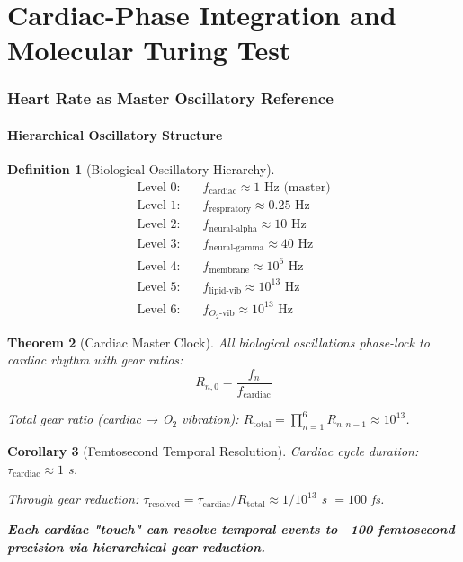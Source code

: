 \documentclass[11pt,a4paper]{article}
\newtheorem{theorem}{Theorem}[section]
\newtheorem{corollary}[theorem]{Corollary}
\theoremstyle{definition}
\newtheorem{definition}[theorem]{Definition}
\theoremstyle{remark}
\begin{document}
\part{Cardiac-Phase Integration and Molecular Turing Test}

\section{Heart Rate as Master Oscillatory Reference}

\subsection{Hierarchical Oscillatory Structure}

\begin{definition}[Biological Oscillatory Hierarchy]
\begin{align}
\text{Level 0}: \quad & f_{\text{cardiac}} \approx 1 \text{ Hz (master)} \\
\text{Level 1}: \quad & f_{\text{respiratory}} \approx 0.25 \text{ Hz} \\
\text{Level 2}: \quad & f_{\text{neural-alpha}} \approx 10 \text{ Hz} \\
\text{Level 3}: \quad & f_{\text{neural-gamma}} \approx 40 \text{ Hz} \\
\text{Level 4}: \quad & f_{\text{membrane}} \approx 10^6 \text{ Hz} \\
\text{Level 5}: \quad & f_{\text{lipid-vib}} \approx 10^{13} \text{ Hz} \\
\text{Level 6}: \quad & f_{O_2\text{-vib}} \approx 10^{13} \text{ Hz}
\end{align}
\end{definition}

\begin{theorem}[Cardiac Master Clock]
All biological oscillations phase-lock to cardiac rhythm with gear ratios:
\begin{equation}
R_{n,0} = \frac{f_n}{f_{\text{cardiac}}}
\end{equation}

Total gear ratio (cardiac → O$_2$ vibration): $R_{\text{total}} = \prod_{n=1}^6 R_{n,n-1} \approx 10^{13}$.
\end{theorem}

\begin{corollary}[Femtosecond Temporal Resolution]
Cardiac cycle duration: $\tau_{\text{cardiac}} \approx 1$ s.

Through gear reduction: $\tau_{\text{resolved}} = \tau_{\text{cardiac}}/R_{\text{total}} \approx 1/10^{13}$ s $= 100$ fs.

\textbf{Each cardiac "touch" can resolve temporal events to ~100 femtosecond precision via hierarchical gear reduction.}
\end{corollary}
\end{document}
